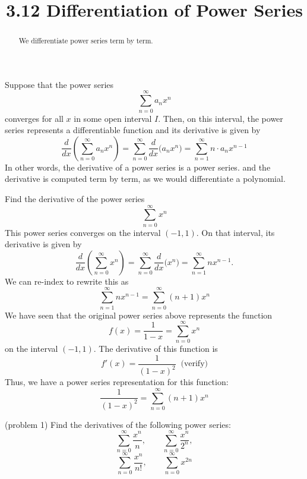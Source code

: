 \documentclass{ximera}
\title{3.12 Differentiation of Power Series}
\begin{document}
\begin{abstract}
We differentiate power series term by term.
\end{abstract}

\maketitle



Suppose that the power series 
\[
\sum_{n=0}^\infty a_n x^n
\]
converges for all $x$ in some open interval $I$. Then, on this interval, the power series represents a differentiable function and its derivative is given by 
\[
\frac{d}{dx} \left( \sum_{n=0}^\infty a_n x^n \right) = \sum_{n=0}^\infty  \frac{d}{dx}\big( a_n x^n \big)  
= \sum_{n=1}^\infty   n\cdot a_n x^{n-1}
\]
In other words, the derivative of a power series is a power series. and the derivative is computed term by term, as we would differentiate a polynomial.

\begin{example}
Find the derivative of the power series
\[
\sum_{n=0}^\infty x^n
\]
This power series converges on the interval $(-1, 1)$.
On that interval, its derivative is given by
\[
\frac{d}{dx}\left( \sum_{n=0}^\infty x^n \right)= \sum_{n=0}^\infty \frac{d}{dx} \big(x^n\big) = \sum_{n=1}^\infty nx^{n-1}.
\]
We can re-index to rewrite this as
\[
\sum_{n=1}^\infty nx^{n-1} = \sum_{n=0}^\infty (n+1)x^n
\]
We have seen that the original power series above represents the function 
\[
f(x) = \frac{1}{1-x} = \sum_{n=0}^\infty x^n
\]
on the interval $(-1, 1)$. The derivative of this function is
\[
f'(x) = \frac{1}{(1-x)^2} \;\; \text{(verify)}
\]
Thus, we have a power series representation for this function:
\[
\frac{1}{(1-x)^2} = \sum_{n=0}^\infty (n+1)x^n
\]
\end{example}



\begin{problem}(problem 1)
Find the derivatives of the following power series:
\[
\sum_{n=0}^\infty \frac{x^n}{n},\qquad \sum_{n=0}^\infty \frac{x^n}{2^n},
\]
\[
 \sum_{n=0}^\infty \frac{x^n}{n!},\qquad \sum_{n=0}^\infty x^{2n}
\]
\end{problem}
\end{document}
